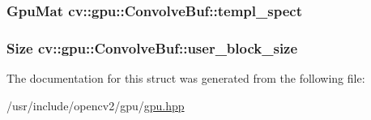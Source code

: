 \hypertarget{structcv_1_1gpu_1_1ConvolveBuf_a35ceeee1b84fbde044e518ea5237ad97}{
\subsubsection[{templ\-\_\-spect}]{\setlength{\rightskip}{0pt plus 5cm}Gpu\-Mat cv\-::gpu\-::\-Convolve\-Buf\-::templ\-\_\-spect}}\label{structcv_1_1gpu_1_1ConvolveBuf_a35ceeee1b84fbde044e518ea5237ad97}
\hypertarget{structcv_1_1gpu_1_1ConvolveBuf_ade057847a290ec2248bd3b2cfca3d917}{
\subsubsection[{user\-\_\-block\-\_\-size}]{\setlength{\rightskip}{0pt plus 5cm}Size cv\-::gpu\-::\-Convolve\-Buf\-::user\-\_\-block\-\_\-size}}\label{structcv_1_1gpu_1_1ConvolveBuf_ade057847a290ec2248bd3b2cfca3d917}


The documentation for this struct was generated from the following file\-:\begin{DoxyCompactItemize}
\item 
/usr/include/opencv2/gpu/\hyperlink{gpu_2gpu_8hpp}{gpu.\-hpp}\end{DoxyCompactItemize}
